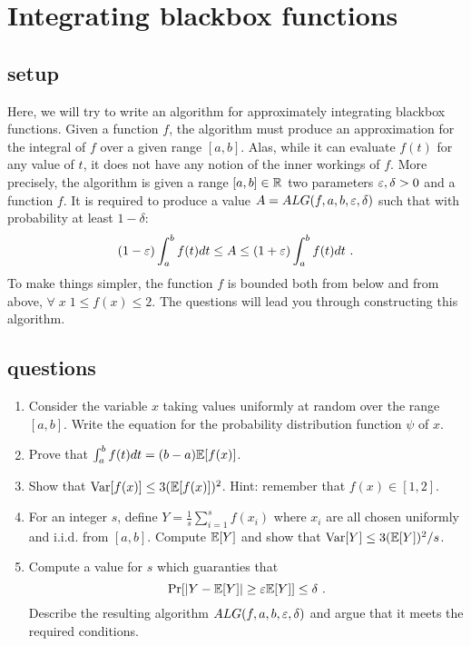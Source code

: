 \documentclass{article}
\begin{document}

\section{Integrating blackbox functions}
\subsection*{setup}
Here, we will try to write an algorithm for approximately integrating blackbox functions.
Given a function $f$, the algorithm must produce an approximation for the integral of $f$ over a given range $[a,b]$.
Alas, while it can evaluate $f(t)$ for any value of $t$, it does not have any notion of the inner workings of $f$. 
More precisely, the algorithm is given a range $[a,b] \in {\mathbb{R}}$ two parameters $\varepsilon, \delta > 0$ and a function $f$.
It is required to produce a value $A = ALG(f,a,b,\varepsilon,\delta)$ such that with probability at least $1 -\delta$:
\[
 (1-\varepsilon) \int_{a}^{b} f(t)dt \le A \le  (1+\varepsilon) \int_{a}^{b} f(t)dt \ . 
\]
To make things simpler, the function $f$ is bounded both from below and from above, $\forall \; x \; 1 \le f(x) \le 2$.
The questions will lead you through constructing this algorithm.

\subsection*{questions}
\begin{enumerate}
\item Consider the variable $x$ taking values uniformly at random over the range $[a,b]$.
Write the equation for the probability distribution function $\psi$ of $x$. 
\item Prove that $\int_{a}^{b}f(t)dt = (b-a){\mathbb E}[f(x)]$.
\item Show that ${\operatorname{Var}}[f(x)] \le 3 ({\mathbb E}[f(x)])^2$. Hint: remember that $f(x) \in [1,2]$.
\item For an integer $s$, define $Y = \frac{1}{s}\sum_{i=1}^{s}f(x_i)$ where $x_i$ are all chosen uniformly and i.i.d. from $[a,b]$.
Compute ${\mathbb E}[Y]$ and show that ${\operatorname{Var}}[Y] \le 3 ({\mathbb E}[Y])^2 /s$.
\item Compute a value for $s$ which guaranties that 
\[
\Pr[ |Y -  {\mathbb E}[Y] | \ge \varepsilon {\mathbb E}[Y]] \le \delta \ .
\]
Describe the resulting algorithm $ALG(f,a,b,\varepsilon,\delta)$ and argue that it meets the required conditions.
\end{enumerate}
\pagebreak
\end{document}
